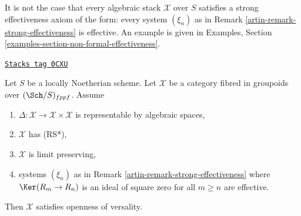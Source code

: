 It is not the case that every algebraic stack $\mathcal{X}$
over $S$ satisfies a strong effectiveness axiom of the form:
every system $(\xi_n)$ as in Remark \ref{artin-remark-strong-effectiveness}
is effective. An example is given in
Examples, Section \ref{examples-section-non-formal-effectiveness}.

\begin{lemma}
\label{artin-lemma-SGE-implies-openness-versality}
\href{https://stacks.math.columbia.edu/tag/0CXU}{\texttt{Stacks tag 0CXU}}

Let $S$ be a locally Noetherian scheme. Let $\mathcal{X}$ be a category fibred
in groupoids over $(\Sch/S)_{fppf}$. Assume
\begin{enumerate}
\item $\Delta : \mathcal{X} \to \mathcal{X} \times \mathcal{X}$ is
representable by algebraic spaces,
\item $\mathcal{X}$ has (RS*),
\item $\mathcal{X}$ is limit preserving,
\item systems $(\xi_n)$ as in Remark \ref{artin-remark-strong-effectiveness}
where $\Ker(R_m \to R_n)$ is an ideal of square zero for all $m \geq n$
are effective.
\end{enumerate}
Then $\mathcal{X}$ satisfies openness of versality.
\end{lemma}

